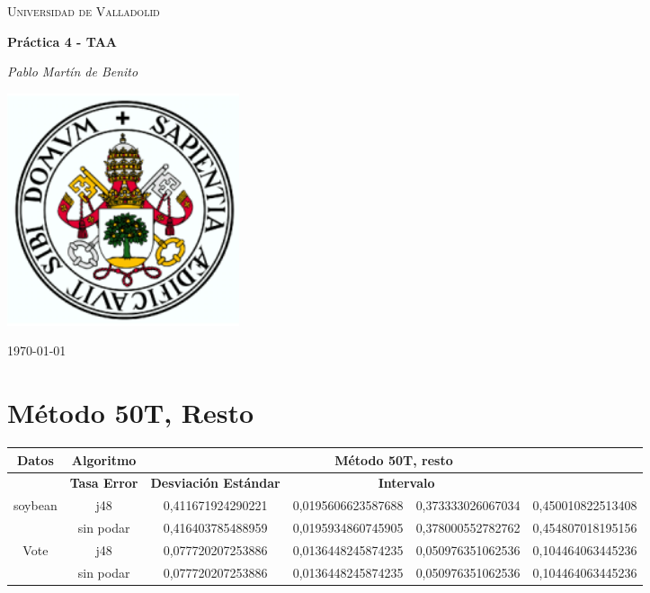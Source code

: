 \documentclass{article}
\begin{document}
\begin{titlepage}
    \centering
    
    \vspace{1cm}
    {\scshape\LARGE Universidad de Valladolid \par}
    \vspace{1.5cm}
    {\huge\bfseries Práctica 4 - TAA\par}
    \vspace{0.5cm}
    {\Large\itshape Pablo Martín de Benito\par}
    \vspace{1.5cm}
    \includegraphics[width=0.3\textwidth]{logo-universidad-de-valladolid.png}\par

    \vfill
    \vfill
    {\large \today\par}
\end{titlepage}

\tableofcontents %

\newpage %

\section{Método 50T, Resto}

\begin{table}[h]
	\begin{adjustbox}{center}
		\begin{tabular}{|c|c|c|c|c|c|}
			\hline
			\rowcolor[gray]{0.8}
			\textbf{Datos} & \textbf{Algoritmo} & \multicolumn{4}{|c|}{\textbf{Método 50T, resto}} \\ \hline
			\rowcolor[gray]{0.8}			
			\multicolumn{2}{|c|}{\textbf{ }} & \textbf{Tasa Error} & \textbf{Desviación Estándar} & 			\multicolumn{2}{|c|}{\textbf{Intervalo}} \\ \hline
			
			soybean & j48 & 0,411671924290221 & 0,0195606623587688 & 0,373333026067034 & 	0,450010822513408 \\ \hline
			 & sin podar	 & 0,416403785488959 & 0,0195934860745905 & 0,378000552782762 & 0,454807018195156 \\ \hline
			Vote	 & j48 & 0,077720207253886 & 0,0136448245874235 & 0,050976351062536 & 0,104464063445236 \\ \hline
			 & sin podar	 & 0,077720207253886 & 0,0136448245874235 & 0,050976351062536 & 	0,104464063445236 \\ \hline
		\end{tabular}
	\end{adjustbox}
\end{table}
\end{document}
